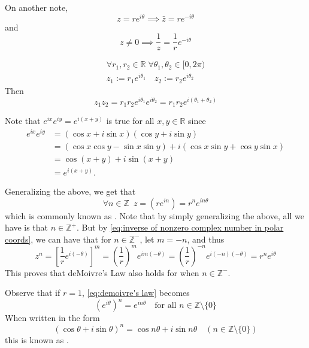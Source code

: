 \documentclass[notoc,notitlepage]{tufte-book}
\begin{document}
On another note,
\begin{equation*}
	z = re^{i \theta} \implies \bar{z} = re^{-i \theta}
\end{equation*}
and
\begin{equation}\label{eq:inverse of nonzero complex number in polar coords}
	z \neq 0 \implies \frac{1}{z} = \frac{1}{r} e^{-i \theta}
\end{equation}

\begin{remark}
	\begin{gather*}
		\forall r_1, r_2 \in \mathbb{R} \; \forall \theta_1, \theta_2 \in [0, 2\pi) \\
		z_1 := r_1 e^{i \theta_1} \quad z_2 := r_2 e^{i \theta_2}
	\end{gather*}
	Then
	\begin{equation*}
		z_1 z_2 = r_1 r_2 e^{i \theta_1} e^{i \theta_2} = r_1 r_2 e^{i (\theta_1 + \theta_2)}
	\end{equation*}

	Note that $e^{ix} e^{iy} = e^{i(x + y)}$ is true for all $x, y \in \mathbb{R} $ since
	\begin{align*}
		e^{ix} e^{iy}
			&= (\cos x + i \sin x)(\cos y + i \sin y) \\
			&= (\cos x \cos y - \sin x \sin y) + i (\cos x \sin y + \cos y \sin x) \\
			&= \cos (x + y) + i \sin (x + y) \\
			&= e^{i (x + y)}.
	\end{align*}

	Generalizing the above, we get that
	\begin{equation}\label{eq:demoivre's law}
		\forall n \in \mathbb{Z} \enspace z = (re^{in}) = r^n e^{in\theta}
	\end{equation}
	which is commonly known as . Note that by simply generalizing the above, all we have is that $n \in \mathbb{Z^+}$. But by \cref{eq:inverse of nonzero complex number in polar coords}, we can have that for $n \in \mathbb{Z^-}$, let $m = -n$, and thus
	\begin{equation*}
		z^n = \left[ \frac{1}{r} e^{i (-\theta)} \right]^m = \left(\frac{1}{r}\right)^m e^{im (-\theta)} = \left(\frac{1}{r} \right)^{-n} e^{i (-n) (-\theta)} = r^n e^{i\theta}
	\end{equation*}
	This proves that deMoivre's Law also holds for when $n \in \mathbb{Z^-}$.

	Observe that if $r = 1$, \cref{eq:demoivre's law} becomes
	\begin{equation}
		(e^{i\theta})^n = e^{in\theta} \quad \text{for all } n \in \mathbb{Z} \setminus \{0\} 
	\end{equation}
	When written in the form
	\begin{equation}\label{eq:demoivre's formula}
		(\cos \theta + i \sin \theta)^n = \cos n\theta + i \sin n\theta \quad (n \in \mathbb{Z} \setminus \{0\})
	\end{equation}
	this is known as .
\end{remark}
\end{document}
